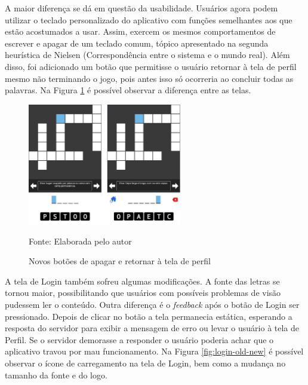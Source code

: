 A maior diferença se dá em questão da usabilidade. Usuários agora podem utilizar o teclado personalizado do aplicativo com funções semelhantes aos que estão acostumados a usar. Assim, exercem os mesmos comportamentos de escrever e apagar de um teclado comum, tópico apresentado na segunda heurística de Nielsen (Correspondência entre o sistema e o mundo real).
Além disso, foi adicionado um botão que permitisse o usuário retornar à tela de perfil mesmo não terminando o jogo, pois antes isso só ocorreria ao concluir todas as palavras. Na Figura \ref{fig:cross-old-new} é possível observar a diferença entre as telas.

\begin{figure}[H]
\centering
    \caption{Novos botões de apagar e retornar à tela de perfil}
    \label{fig:cross-old-new}
    \includegraphics[width=0.6\textwidth]{Figuras/cross-old-new.jpg}
    
    Fonte: Elaborada pelo autor
\end{figure}

A tela de Login também sofreu algumas modificações. A fonte das letras se tornou maior, possibilitando que usuários com possíveis problemas de visão pudessem ler o conteúdo. Outra diferença é o \textit{feedback} após o botão de Login ser pressionado. Depois de clicar no botão a tela permanecia estática, esperando a resposta do servidor para exibir a mensagem de erro ou levar o usuário à tela de Perfil. Se o servidor demorasse a responder o usuário poderia achar que o aplicativo travou por mau funcionamento. Na Figura \ref{fig:login-old-new} é possível observar o ícone de carregamento na tela de Login, bem como a mudança no tamanho da fonte e do logo.

    
